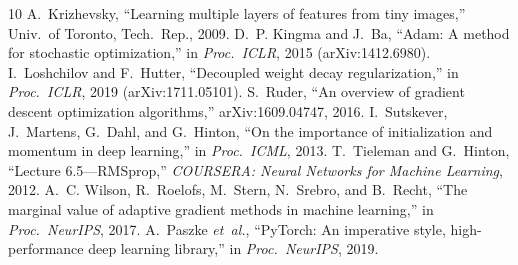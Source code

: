 \documentclass[conference]{IEEEtran}
\begin{document}
\begin{thebibliography}{10}
 A.~Krizhevsky, ``Learning multiple layers of features from tiny images,'' Univ.\ of Toronto, Tech.\ Rep., 2009.
 D.~P. Kingma and J.~Ba, ``Adam: A method for stochastic optimization,'' in \emph{Proc.\ ICLR}, 2015 (arXiv:1412.6980).
 I.~Loshchilov and F.~Hutter, ``Decoupled weight decay regularization,'' in \emph{Proc.\ ICLR}, 2019 (arXiv:1711.05101).
 S.~Ruder, ``An overview of gradient descent optimization algorithms,'' arXiv:1609.04747, 2016.
 I.~Sutskever, J.~Martens, G.~Dahl, and G.~Hinton, ``On the importance of initialization and momentum in deep learning,'' in \emph{Proc.\ ICML}, 2013.
 T.~Tieleman and G.~Hinton, ``Lecture 6.5---RMSprop,'' \emph{COURSERA: Neural Networks for Machine Learning}, 2012.
 A.~C. Wilson, R.~Roelofs, M.~Stern, N.~Srebro, and B.~Recht, ``The marginal value of adaptive gradient methods in machine learning,'' in \emph{Proc.\ NeurIPS}, 2017.
 A.~Paszke \emph{et~al.}, ``PyTorch: An imperative style, high-performance deep learning library,'' in \emph{Proc.\ NeurIPS}, 2019.
\end{thebibliography}
\end{document}
